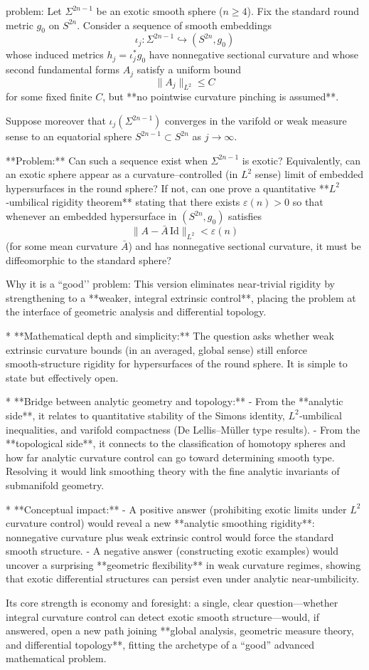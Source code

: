 problem:  
Let $\Sigma^{2n-1}$ be an exotic smooth sphere ($n \ge 4$).  
Fix the standard round metric $g_0$ on $S^{2n}$.  
Consider a sequence of smooth embeddings  
\[
\iota_j:\Sigma^{2n-1}\hookrightarrow (S^{2n},g_0)
\]
whose induced metrics $h_j = \iota_j^*g_0$ have nonnegative sectional curvature and whose second fundamental forms $A_j$ satisfy a uniform bound  
\[
\|A_j\|_{L^2} \le C
\]
for some fixed finite $C$, but **no pointwise curvature pinching is assumed**.  

Suppose moreover that $\iota_j(\Sigma^{2n-1})$ converges in the varifold or weak measure sense to an equatorial sphere $S^{2n-1}\subset S^{2n}$ as $j\to\infty$.  

**Problem:**  
Can such a sequence exist when $\Sigma^{2n-1}$ is exotic?  
Equivalently, can an exotic sphere appear as a curvature–controlled (in $L^2$ sense) limit of embedded hypersurfaces in the round sphere?  
If not, can one prove a quantitative **$L^2$‑umbilical rigidity theorem** stating that there exists $\varepsilon(n)>0$ so that whenever an embedded hypersurface in $(S^{2n},g_0)$ satisfies  
\[
\|A - \bar A\,\mathrm{Id}\|_{L^2} < \varepsilon(n)
\]
(for some mean curvature $\bar A$) and has nonnegative sectional curvature, it must be diffeomorphic to the standard sphere?

Why it is a “good’’ problem:  
This version eliminates near‑trivial rigidity by strengthening to a **weaker, integral extrinsic control**, placing the problem at the interface of geometric analysis and differential topology.  

* **Mathematical depth and simplicity:** The question asks whether weak extrinsic curvature bounds (in an averaged, global sense) still enforce smooth‑structure rigidity for hypersurfaces of the round sphere. It is simple to state but effectively open.  

* **Bridge between analytic geometry and topology:**  
  - From the **analytic side**, it relates to quantitative stability of the Simons identity, $L^2$‑umbilical inequalities, and varifold compactness (De Lellis–Müller type results).  
  - From the **topological side**, it connects to the classification of homotopy spheres and how far analytic curvature control can go toward determining smooth type. Resolving it would link smoothing theory with the fine analytic invariants of submanifold geometry.  

* **Conceptual impact:**  
  - A positive answer (prohibiting exotic limits under $L^2$ curvature control) would reveal a new **analytic smoothing rigidity**: nonnegative curvature plus weak extrinsic control would force the standard smooth structure.  
  - A negative answer (constructing exotic examples) would uncover a surprising **geometric flexibility** in weak curvature regimes, showing that exotic differential structures can persist even under analytic near‑umbilicity.

Its core strength is economy and foresight: a single, clear question—whether integral curvature control can detect exotic smooth structure—would, if answered, open a new path joining **global analysis, geometric measure theory, and differential topology**, fitting the archetype of a “good” advanced mathematical problem.
